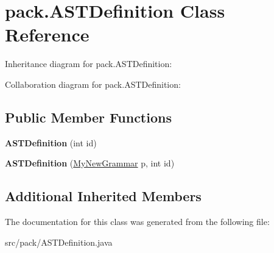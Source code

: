 \hypertarget{classpack_1_1_a_s_t_definition}{}\section{pack.\+A\+S\+T\+Definition Class Reference}
\label{classpack_1_1_a_s_t_definition}


Inheritance diagram for pack.\+A\+S\+T\+Definition\+:


Collaboration diagram for pack.\+A\+S\+T\+Definition\+:
\subsection*{Public Member Functions}
\begin{DoxyCompactItemize}
\item 
{\bfseries A\+S\+T\+Definition} (int id)\hypertarget{classpack_1_1_a_s_t_definition_a1a6b4276fa4e469732052fc236f98ff1}{}\label{classpack_1_1_a_s_t_definition_a1a6b4276fa4e469732052fc236f98ff1}

\item 
{\bfseries A\+S\+T\+Definition} (\hyperlink{classpack_1_1_my_new_grammar}{My\+New\+Grammar} p, int id)\hypertarget{classpack_1_1_a_s_t_definition_a32da1e56d7b65c41673e42b50828bf45}{}\label{classpack_1_1_a_s_t_definition_a32da1e56d7b65c41673e42b50828bf45}

\end{DoxyCompactItemize}
\subsection*{Additional Inherited Members}


The documentation for this class was generated from the following file\+:\begin{DoxyCompactItemize}
\item 
src/pack/A\+S\+T\+Definition.\+java\end{DoxyCompactItemize}
